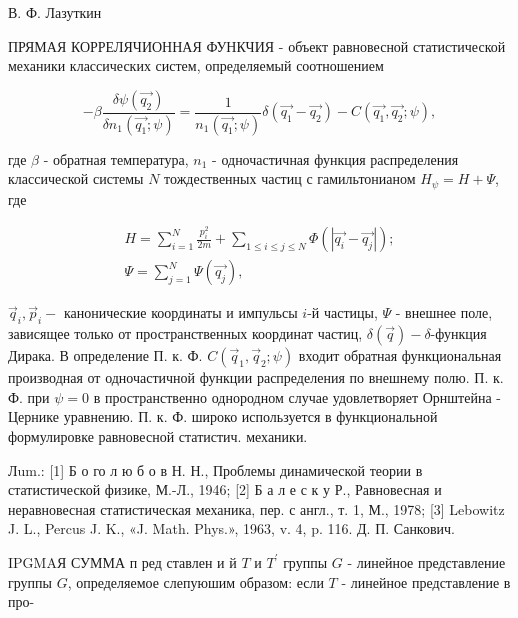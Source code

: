\documentclass[10pt]{article}
\begin{document}
В. Ф. Лазуткин



ПРЯМАЯ КОРРЕЛЯЧИОННАЯ ФУНКЧИЯ - объект равновесной статистической механики классических систем, определяемый соотношением



\[

-\beta \frac{\delta \psi\left(\overrightarrow{q_{2}}\right)}{\delta n_{1}\left(\overrightarrow{q_{1}} ; \psi\right)}=\frac{1}{n_{1}\left(\overrightarrow{q_{1}} ; \psi\right)} \delta\left(\overrightarrow{q_{1}}-\overrightarrow{q_{2}}\right)-C\left(\overrightarrow{q_{1}}, \overrightarrow{q_{2}} ; \psi\right),

\]



где $\beta$ - обратная температура, $n_{1}$ - одночастичная функция распределения классической системы $N$ тождественных частиц с гамильтонианом $H_{\psi}=H+\Psi$, где



\[

\begin{gathered}

H=\sum_{i=1}^{N} \frac{p_{i}^{2}}{2 m}+\sum_{1 \leqslant i \leqslant j \leqslant N} \Phi\left(\left|\overrightarrow{q_{i}}-\overrightarrow{q_{j}}\right|\right) ; \\

\Psi=\sum_{j=1}^{N} \Psi\left(\overrightarrow{q_{j}}\right),

\end{gathered}

\]



$\vec{q}_{i}, \vec{p}_{i}-$ канонические координаты и импульсы $i$-й частицы, $\Psi$ - внешнее поле, зависящее только от пространственных координат частиц, $\delta(\vec{q})-\delta$-функция Дирака. В определение П. к. Ф. $C\left(\vec{q}_{1}, \vec{q}_{2} ; \psi\right)$ входит обратная функциональная производная от одночастичной функции распределения по внешнему полю. П. к. Ф. при $\psi=0$ в пространственно однородном случае удовлетворяет Орнштейна - Цернике уравнению. П. к. Ф. широко используется в функциональной формулировке равновесной статистич. механики.



Лum.: [1] Б о го л ю б о в Н. Н., Проблемы динамической теории в статистической физике, М.-Л., 1946; [2] Б а л е с к у Р., Равновесная и неравновесная статистическая механика, пер. с англ., т. 1, М., 1978; [3] Lebowitz J. L., Percus J. K., «J. Math. Phys.», 1963, v. 4, p. 116. Д. П. Санкович.



IPGMAЯ СУММА п ред ставлен и й $T$ и $T^{\prime}$ группы $G$ - линейное представление группы $G$, определяемое слепуюшим образом: если $T$ - линейное представление в про-
\end{document}
